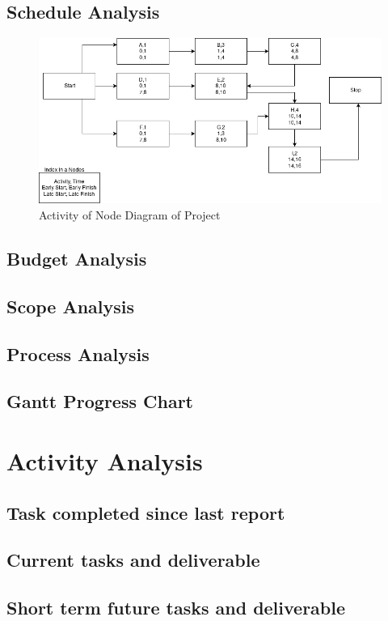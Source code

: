 \documentclass[a4paper, 12pt, onepage]{article}
\begin{document}
      \subsection{Schedule Analysis}
      \begin{figure}[ht!]
	      \includegraphics[width=450px]{aschedule.png}
	      \caption{Activity of Node Diagram of Project}
	\end{figure}
      \subsection{Budget Analysis}
      \subsection{Scope Analysis}
      \subsection{Process Analysis}
      \subsection{Gantt Progress Chart}

      \cleardoublepage
      \section{Activity Analysis}
      \subsection{Task completed since last report}
      \subsection{Current tasks and deliverable}
      \subsection{Short term future tasks and deliverable}
\end{document}

